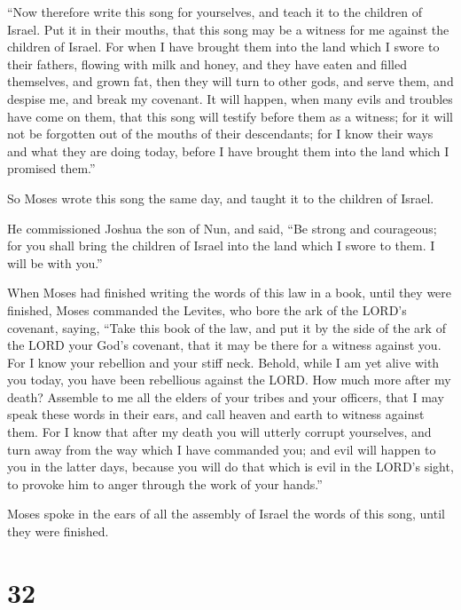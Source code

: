  ``Now therefore write this song for yourselves, and
teach it to the children of Israel. Put it in their mouths, that this
song may be a witness for me against the children of Israel.
 For when I have brought them into the land which I swore
to their fathers, flowing with milk and honey, and they have eaten and
filled themselves, and grown fat, then they will turn to other gods, and
serve them, and despise me, and break my covenant.  It
will happen, when many evils and troubles have come on them, that this
song will testify before them as a witness; for it will not be forgotten
out of the mouths of their descendants; for I know their ways and what
they are doing today, before I have brought them into the land which I
promised them.''

 So Moses wrote this song the same day, and taught it to
the children of Israel.

 He commissioned Joshua the son of Nun, and said, ``Be
strong and courageous; for you shall bring the children of Israel into
the land which I swore to them. I will be with you.''

 When Moses had finished writing the words of this law in
a book, until they were finished,  Moses commanded the
Levites, who bore the ark of the LORD's covenant, saying,
 ``Take this book of the law, and put it by the side of
the ark of the LORD your God's covenant, that it may be there for a
witness against you.  For I know your rebellion and your
stiff neck. Behold, while I am yet alive with you today, you have been
rebellious against the LORD. How much more after my death?
 Assemble to me all the elders of your tribes and your
officers, that I may speak these words in their ears, and call heaven
and earth to witness against them.  For I know that after
my death you will utterly corrupt yourselves, and turn away from the way
which I have commanded you; and evil will happen to you in the latter
days, because you will do that which is evil in the LORD's sight, to
provoke him to anger through the work of your hands.''

 Moses spoke in the ears of all the assembly of Israel
the words of this song, until they were finished.

\hypertarget{section-31}{%
\section{32}\label{section-31}}

